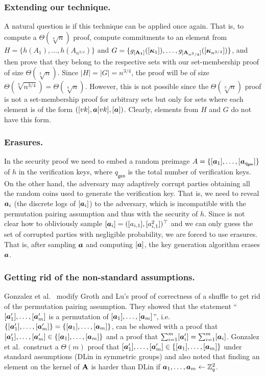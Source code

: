 \subsubsection{Extending our technique.}
A natural question is if this technique can be applied once again. That is, to compute a $\Theta(\sqrt[4]{n})$  proof, compute commitments to an element from $H=\{h(A_1),\ldots,h(A_{n^{3/4}})\}$ and
$G=\allowbreak\{
	g_{[\mathbf{{A_1}}]}
		([
			{\boldsymbol{\kappa}}_1]),
	\ldots,\allowbreak
	g_{[\mathbf{{A}}_{n^3/4}]}
		([
			{\boldsymbol{\kappa}}_{n^{3/4}}
])\}$,
and then prove that they belong to the respective sets with our set-membership proof of size $\Theta(\sqrt[3]{n})$. Since $|H|=|G|=n^{3/4}$, the proof will be of size $\Theta(\sqrt[3]{n^{3/4}})=\Theta(\sqrt[4]{n})$. However, this is not possible since the $\Theta(\sqrt[3]{n})$ proof is not a set-membership proof for arbitrary sets but only for sets where each element is of the form $([vk],{\boldsymbol{a}}[vk],[{\boldsymbol{a}}])$. Clearly, elements from $H$ and $G$ do not have this form.


\subsubsection{Erasures.}
In the security proof we need to embed a random preimage $A=\{[{\boldsymbol{a}}_1],\ldots,\allowbreak [{\boldsymbol{a}}_{q_{\mathsf{gen}}}]\}$ of $h$ in the verification keys, where $q_{\mathsf{gen}}$ is the total number of verification keys. On the other hand, the adversary may adaptively corrupt parties obtaining all the random coins used to generate the verification key. That is, we need to reveal ${\boldsymbol{a}}_i$ (the discrete logs of $[{\boldsymbol{a}}_i]$) to the adversary, which is incompatible with the permutation pairing assumption and thus with the security of $h$. Since is not clear how to obliviously sample $[{\boldsymbol{a}}_i]=([a_{i,1}],[a_{i,1}^2])^\top$ and we can only guess the set of corrupted parties with negligible probability, we are forced to use erasures. That is, after sampling ${\boldsymbol{a}}$ and computing $[{\boldsymbol{a}}]$, the key generation algorithm erases ${\boldsymbol{a}}$.

\subsubsection{Getting rid of the non-standard assumptions.} Gonzalez et al.~\cite{ACNS:GonRaf16} modify Groth and Lu's proof of correctness of a shuffle \cite{AC:GroLu07} to get rid of the permutation pairing assumption. They showed that the statement ``$[{\boldsymbol{a}}'_1],\ldots,[{\boldsymbol{a}}'_m]$ is a permutation of $[{\boldsymbol{a}}_1],\ldots,[{\boldsymbol{a}}_m]$'', i.e.~$\{[{\boldsymbol{a}}'_1],\ldots,[{\boldsymbol{a}}'_m]\}=\{[{\boldsymbol{a}}_1],\ldots,[{\boldsymbol{a}}_m]\}$, can be showed with a proof that $[{\boldsymbol{a}}'_1],\ldots,[{\boldsymbol{a}}'_m]\in\{[{\boldsymbol{a}}_1],\ldots,[{\boldsymbol{a}}_m]\}$ and a proof that $\sum_{i=1}^m [{\boldsymbol{a}}'_i]=\sum_{i=1}^m [{\boldsymbol{a}}_i]$.  Gonzalez et al.~construct a $\Theta(m)$ proof that $[{\boldsymbol{a}}'_1],\ldots,[{\boldsymbol{a}}'_m]\in\{[{\boldsymbol{a}}_1],\ldots\allowbreak,[{\boldsymbol{a}}_m]\}$ under standard assumptions (DLin in symmetric groups)  and also noted that finding an element on the kernel of $\mathbf{{A}}$ is harder than DLin if ${\boldsymbol{a}}_1,\ldots,{\boldsymbol{a}}_m\gets\mathbb{Z}_q^2$.

